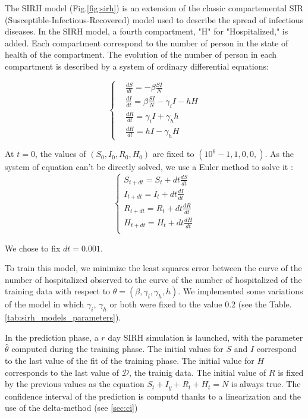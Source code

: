 The SIRH model (Fig.\ref{fig:sirh}) is an extension of the classic compartemental SIR (Susceptible-Infectious-Recovered) model used to describe the spread of infectious diseases.
In the SIRH model, a fourth compartment, "H" for "Hospitalized," is added. 
Each compartment correspond to the number of person in the state of health of the compartment. 
The evolution of the number of person in each compartment is described by a system of ordinary differential equations: 

\begin{equation}
    \label{eq:sirh}
    \left\{
    \begin{aligned}
        &\frac{dS}{dt} = - \beta \frac{SI}{N} \\
        &\frac{dI}{dt} = \beta \frac{SI}{N} - \gamma_i I - h H \\
        &\frac{dR}{dt} = \gamma_i I + \gamma_h h \\
        &\frac{dH}{dt} = h I - \gamma_h H
    \end{aligned}
    \right.
\end{equation}

At $t=0$, the values of $(S_0, I_0, R_0, H_0)$ are fixed to $(10^6 -1, 1, 0, 0,) $. 
As the system of equation can't be directly solved, we use a Euler method to solve it : \\


\begin{equation}
    \left\{
    \begin{aligned}
        S_{t+dt}=S_t + dt \frac{dS}{dt}\\
        I_{t+dt}=I_t + dt \frac{dI}{dt}\\
        R_{t+dt}=R_t + dt \frac{dR}{dt}\\
        H_{t+dt}=H_t + dt \frac{dH}{dt}\\
    \end{aligned}
    \right.
\end{equation}


We chose to fix $dt=0.001$. 




To train this model, we minimize the least squares error between the curve of the number of hospitalized observed to the curve of the number of hospitalized of the training data with respect to $\theta = (\beta, \gamma_i, \gamma_h, h)$. 
We implemented some variations of the model in which $\gamma_i$, $\gamma_h$ or both were fixed to the value $0.2$ (see the Table.\ref{tab:sirh_models_parameters}).


In the prediction phase, a $r$ day SIRH simulation is launched, with the parameter $\hat{\theta}$ computed during the training phase. 
The initial values for $S$ and $I$ correspond to the last value of the fit of the training phase. 
The initial value for $H$ corresponds to the last value of $\mathcal{D}$, the trainig data. 
The initial value of $R$ is fixed by the previous values as the equation $S_t + I_y + R_t + H_t = N$ is always true. 
The confidence interval of the prediction is computd thanks to a linearization and the use of the delta-method (see \ref{sec:ci})



